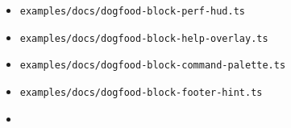 \begin{itemize}
\begin{itemize}
  \item
    \texttt{e\allowbreak{}x\allowbreak{}a\allowbreak{}m\allowbreak{}p\allowbreak{}l\allowbreak{}e\allowbreak{}s\allowbreak{}/\allowbreak{}d\allowbreak{}o\allowbreak{}c\allowbreak{}s\allowbreak{}/\allowbreak{}d\allowbreak{}o\allowbreak{}g\allowbreak{}f\allowbreak{}o\allowbreak{}o\allowbreak{}d\allowbreak{}-\allowbreak{}b\allowbreak{}l\allowbreak{}o\allowbreak{}c\allowbreak{}k\allowbreak{}-\allowbreak{}p\allowbreak{}e\allowbreak{}r\allowbreak{}f\allowbreak{}-\allowbreak{}h\allowbreak{}u\allowbreak{}d\allowbreak{}.\allowbreak{}t\allowbreak{}s}
  \item
    \texttt{e\allowbreak{}x\allowbreak{}a\allowbreak{}m\allowbreak{}p\allowbreak{}l\allowbreak{}e\allowbreak{}s\allowbreak{}/\allowbreak{}d\allowbreak{}o\allowbreak{}c\allowbreak{}s\allowbreak{}/\allowbreak{}d\allowbreak{}o\allowbreak{}g\allowbreak{}f\allowbreak{}o\allowbreak{}o\allowbreak{}d\allowbreak{}-\allowbreak{}b\allowbreak{}l\allowbreak{}o\allowbreak{}c\allowbreak{}k\allowbreak{}-\allowbreak{}h\allowbreak{}e\allowbreak{}l\allowbreak{}p\allowbreak{}-\allowbreak{}o\allowbreak{}v\allowbreak{}e\allowbreak{}r\allowbreak{}l\allowbreak{}a\allowbreak{}y\allowbreak{}.\allowbreak{}t\allowbreak{}s}
  \item
    \texttt{e\allowbreak{}x\allowbreak{}a\allowbreak{}m\allowbreak{}p\allowbreak{}l\allowbreak{}e\allowbreak{}s\allowbreak{}/\allowbreak{}d\allowbreak{}o\allowbreak{}c\allowbreak{}s\allowbreak{}/\allowbreak{}d\allowbreak{}o\allowbreak{}g\allowbreak{}f\allowbreak{}o\allowbreak{}o\allowbreak{}d\allowbreak{}-\allowbreak{}b\allowbreak{}l\allowbreak{}o\allowbreak{}c\allowbreak{}k\allowbreak{}-\allowbreak{}c\allowbreak{}o\allowbreak{}m\allowbreak{}m\allowbreak{}a\allowbreak{}n\allowbreak{}d\allowbreak{}-\allowbreak{}p\allowbreak{}a\allowbreak{}l\allowbreak{}e\allowbreak{}t\allowbreak{}t\allowbreak{}e\allowbreak{}.\allowbreak{}t\allowbreak{}s}
  \item
    \texttt{e\allowbreak{}x\allowbreak{}a\allowbreak{}m\allowbreak{}p\allowbreak{}l\allowbreak{}e\allowbreak{}s\allowbreak{}/\allowbreak{}d\allowbreak{}o\allowbreak{}c\allowbreak{}s\allowbreak{}/\allowbreak{}d\allowbreak{}o\allowbreak{}g\allowbreak{}f\allowbreak{}o\allowbreak{}o\allowbreak{}d\allowbreak{}-\allowbreak{}b\allowbreak{}l\allowbreak{}o\allowbreak{}c\allowbreak{}k\allowbreak{}-\allowbreak{}f\allowbreak{}o\allowbreak{}o\allowbreak{}t\allowbreak{}e\allowbreak{}r\allowbreak{}-\allowbreak{}h\allowbreak{}i\allowbreak{}n\allowbreak{}t\allowbreak{}.\allowbreak{}t\allowbreak{}s}
  \item

\end{itemize}
\end{itemize}
